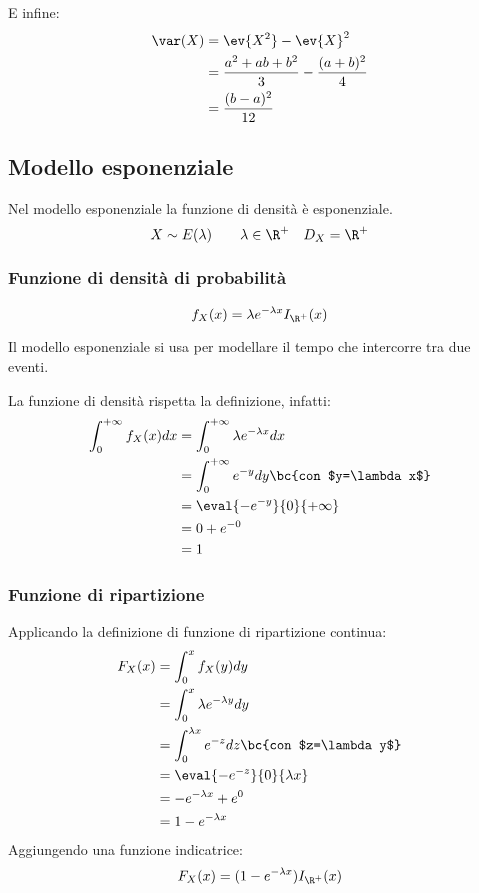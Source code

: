 E infine:
\begin{align*}
	\var(X) & = \ev{X^2} - \ev{X}^2                      \\
	        & = \frac{a^2+ab+b^2}{3} - \frac{(a+b)^2}{4} \\
	        & = \frac{(b-a)^2}{12}
\end{align*}


\subsection{Modello esponenziale}
Nel modello esponenziale la funzione di densità è esponenziale.
\begin{equation*}
	X\sim E(\lambda) \qquad \lambda\in\R^+ \quad D_X=\R^+
\end{equation*}


\subsubsection{Funzione di densità di probabilità}
\begin{equation*}
	f_X(x) = \lambda e^{-\lambda x} I_{\R^+}(x)
\end{equation*}

Il modello esponenziale si usa per modellare il tempo che intercorre tra due eventi.

La funzione di densità rispetta la definizione, infatti:
\begin{align*}
	\int_0^{+\infty} f_X(x)dx & = \int_0^{+\infty} \lambda e^{-\lambda x} dx       \\
	                          & = \int_0^{+\infty} e^{-y}dy \bc{con $y=\lambda x$} \\
	                          & = \eval{-e^{-y}}{0}{+\infty}                       \\
	                          & = 0 + e^{-0}                                       \\
	                          & = 1
\end{align*}


\subsubsection{Funzione di ripartizione}
Applicando la definizione di funzione di ripartizione continua:
\begin{align*}
	F_X(x) & = \int_0^x f_X(y)dy                                  \\
	       & = \int_0^x \lambda e^{-\lambda y}dy                  \\
	       & = \int_0^{\lambda x} e^{-z}dz \bc{con $z=\lambda y$} \\
	       & = \eval{-e^{-z}}{0}{\lambda x}                       \\
	       & = -e^{-\lambda x} + e^0                              \\
	       & = 1-e^{-\lambda x}
\end{align*}
Aggiungendo una funzione indicatrice:
\begin{equation}
	F_X(x) = (1 - e^{-\lambda x})I_{\R^+}(x)
\end{equation}



